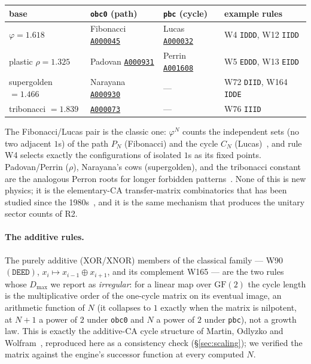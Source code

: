 \documentclass[11pt]{article}
\newcommand{\rt}[1]{\texttt{#1}}
\newcommand{\oeis}[1]{\href{https://oeis.org/#1}{\texttt{#1}}}
\begin{document}
\begin{center}\small
\begin{tabular}{@{}l l l l@{}}
\toprule
base & \rt{obc0} (path) & \rt{pbc} (cycle) & example rules \\
\midrule
$\varphi=1.618$ & Fibonacci \oeis{A000045} & Lucas \oeis{A000032} &
  W4 \rt{IDDD}, W12 \rt{IIDD} \\
plastic $\rho=1.325$ & Padovan \oeis{A000931} & Perrin \oeis{A001608} &
  W5 \rt{EDDD}, W13 \rt{EIDD} \\
supergolden $=1.466$ & Narayana \oeis{A000930} & --- & W72 \rt{DIID}, W164 \rt{IDDE} \\
tribonacci $=1.839$ & \oeis{A000073} & --- & W76 \rt{IIID} \\
\bottomrule
\end{tabular}
\end{center}

The Fibonacci/Lucas pair is the classic one: $\varphi^N$ counts the independent
sets (no two adjacent $1$s) of the path $P_N$ (Fibonacci) and the cycle $C_N$
(Lucas)~\cite{prodinger,oeis}, and rule W4 selects exactly the configurations of
isolated $1$s as its fixed points. Padovan/Perrin ($\rho$), Narayana's cows
(supergolden), and the tribonacci constant are the analogous Perron roots for
longer forbidden patterns~\cite{lindmarcus}. None of this is new physics; it is
the elementary-CA transfer-matrix combinatorics that has been studied since the
1980s~\cite{wolfram,transfermatrix,fibcycles}, and it is the same mechanism that
produces the unitary sector counts of R2.

\paragraph{The additive rules.} The purely additive ($\mathrm{XOR}$/$\mathrm{XNOR}$)
members of the classical family --- W90 $(\rt{DEED})$, $x_i\mapsto x_{i-1}\oplus
x_{i+1}$, and its complement W165 --- are the two rules whose $D_{\max}$ we report
as \emph{irregular}: for a linear map over $\mathrm{GF}(2)$ the cycle length is
the multiplicative order of the one-cycle matrix on its eventual image, an
arithmetic function of $N$ (it collapses to $1$ exactly when the matrix is
nilpotent, at $N{+}1$ a power of $2$ under \rt{obc0} and $N$ a power of $2$ under
\rt{pbc}), not a growth law. This is exactly the additive-CA cycle structure of
Martin, Odlyzko and Wolfram~\cite{mow}, reproduced here as a consistency check
(\S\ref{sec:scaling}); we verified the matrix against the engine's successor
function at every computed $N$.
\end{document}
